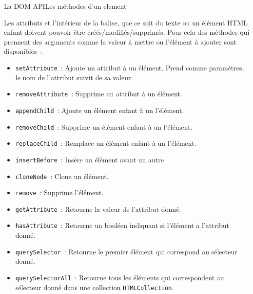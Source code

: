 \documentclass{beamer}
\begin{document}
    \begin{frame}{La DOM API}{Les méthodes d'un element}
        \begin{footnotesize}
            Les attributs et l'intérieur de la balise, que ce soit du texte ou un élément HTML enfant doivent pouvoir être créés/modifiés/supprimés.
            Pour cela des méthodes qui prennent des arguments comme la valeur à mettre ou l'élément à ajouter sont disponibles~:
            \begin{itemize}
                \item \lstinline{setAttribute}~: Ajoute un attribut à un élément.
                Prend comme paramètres, le nom de l'attribut suivit de sa valeur.
                \item \lstinline{removeAttribute}~: Supprime un attribut à un élément.
                \item \lstinline{appendChild}~: Ajoute un élément enfant à un l'élément.
                \item \lstinline{removeChild}~: Supprime un élément enfant à un l'élément.
                \item \lstinline{replaceChild}~: Remplace un élément enfant à un l'élément.
                \item \lstinline{insertBefore}~: Insère un élément avant un autre
                \item \lstinline{cloneNode}~: Clone un élément.
                \item \lstinline{remove}~: Supprime l'élément.
                \item \lstinline{getAttribute}~: Retourne la valeur de l'attribut donné.
                \item \lstinline{hasAttribute}~: Retourne un booléen indiquant si l'élément a l'attribut donné.
                \item \lstinline{querySelector}~: Retourne le premier élément qui correspond au sélecteur donné.
                \item \lstinline{querySelectorAll}~: Retourne tous les éléments qui correspondent au sélecteur donné dans une collection \lstinline{HTMLCollection}.
            \end{itemize}
        \end{footnotesize}
    \end{frame}
\end{document}

